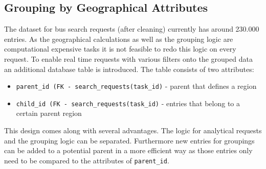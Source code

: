 \subsection{Grouping by Geographical Attributes}
The dataset for bus search requests (after cleaning) currently has around 230.000 entries. As the geographical calculations as well as the grouping logic are computational expensive tasks it is not feasible to redo this logic on every request. To enable real time requests with various filters onto the grouped data an additional database table is introduced. The table consists of two attributes: 
\begin{itemize}
\item \verb|parent_id (FK - search_requests(task_id)| - parent that defines a region 
\item \verb|child_id (FK - search_requests(task_id)| - entries that belong to a certain parent region  
\end{itemize}
This design comes along with several advantages. The logic for analytical requests and the grouping logic can be separated. Furthermore new entries for groupings can be added to a potential parent in a more efficient way as those entries only need to be compared to the attributes of \verb|parent_id|.

